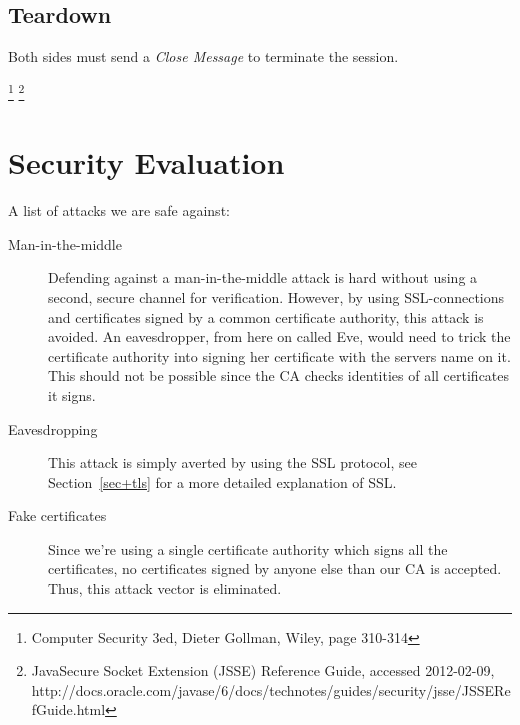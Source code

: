 \documentclass[10pt, a4paper]{article}
\begin{document}
\subsection{Teardown}
Both sides must send a \emph{Close Message} to terminate the session.


\footnote{Computer Security 3ed, Dieter Gollman, Wiley, page 310-314}
\footnote{Java\textregistered Secure Socket Extension (JSSE) Reference Guide, accessed 2012-02-09, http://docs.oracle.com/javase/6/docs/technotes/guides/security/jsse/JSSERefGuide.html}


\section{Security Evaluation}
A list of attacks we are safe against:
\begin{description}
\item[Man-in-the-middle] Defending against a man-in-the-middle attack is hard without using a second, secure channel for verification. However, by using SSL-connections and certificates signed by a common certificate authority, this attack is avoided. An eavesdropper, from here on called Eve, would need to trick the certificate authority into signing her certificate with the servers name on it. This should not be possible since the CA checks identities of all certificates it signs.
\item[Eavesdropping] This attack is simply averted by using the SSL protocol, see Section~\ref{sec+tls} for a more detailed explanation of SSL.
\item[Fake certificates] Since we're using a single certificate authority which signs all the certificates, no certificates signed by anyone else than our CA is accepted. Thus, this attack vector is eliminated.
\end{description}
\end{document}
